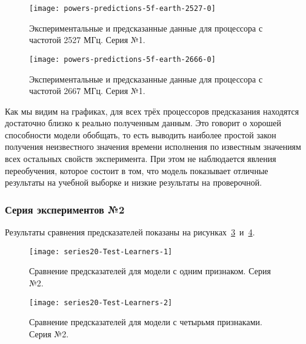 \begin{figure}[H]
    \begin{center}
        \texttt{[image: powers-predictions-5f-earth-2527-0]}
        \caption{Экспериментальные и предсказанные данные для процессора с частотой 2527 МГц. Серия №1.}
        \label{img:powers-predictions-5f-earth-2527-0}
    \end{center}
\end{figure}

\begin{figure}[H]
    \begin{center}
        \texttt{[image: powers-predictions-5f-earth-2666-0]}
        \caption{Экспериментальные и предсказанные данные для процессора с частотой 2667 МГц. Серия №1.}
        \label{img:powers-predictions-5f-earth-2666-0}
    \end{center}
\end{figure}

Как мы видим на графиках, для всех трёх процессоров предсказания находятся достаточно близко к реально полученным данным. Это говорит о хорошей способности модели обобщать, то есть выводить наиболее простой закон получения неизвестного значения времени исполнения по известным значениям всех остальных свойств эксперимента. При этом не наблюдается явления переобучения, которое состоит в том, что модель показывает отличные результаты на учебной выборке и низкие результаты на проверочной.

\subsubsection{Серия экспериментов №2}

Результаты сравнения предсказателей показаны на рисунках~\ref{img:series20-Test-Learners-1}~и~\ref{img:series20-Test-Learners-2}.

\begin{figure}[H]
    \begin{center}
            \texttt{[image: series20-Test-Learners-1]}
            \caption{Сравнение предсказателей для модели с одним признаком. Серия №2.} %
            \label{img:series20-Test-Learners-1} %
    \end{center}
\end{figure}

\begin{figure}[H]
    \begin{center}
            \texttt{[image: series20-Test-Learners-2]}
            \caption{Сравнение предсказателей для модели с четырьмя признаками. Серия №2.}
            \label{img:series20-Test-Learners-2}
    \end{center}
\end{figure}


